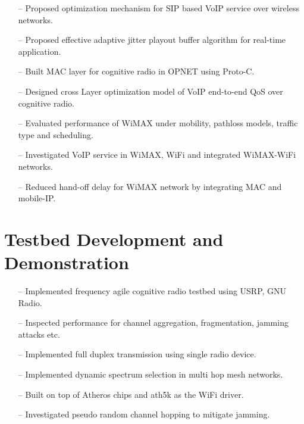 \documentclass[11pt,letterpaper,sans]{moderncv}   %
\begin{document}
  {
  \begin{itemize}
    \item[--] Proposed optimization mechanism for SIP based VoIP service over wireless networks.
    \item[--] Proposed effective adaptive jitter playout buffer algorithm for real-time application.
    \item[--] Built MAC layer for cognitive radio in OPNET using Proto-C.
    \item[--] Designed cross Layer optimization model of VoIP end-to-end QoS over cognitive radio.
  \end{itemize}
  }


  {
  \begin{itemize}
    \item[--] Evaluated performance of WiMAX under mobility, pathloss models, traffic type and scheduling.
    \item[--] Investigated VoIP service in WiMAX, WiFi and integrated WiMAX-WiFi networks.
    \item[--] Reduced hand-off delay for WiMAX network  by integrating  MAC and mobile-IP.
  \end{itemize}
  }


\section{Testbed Development and Demonstration}
  {
  \begin{itemize}
    \item[--] Implemented frequency agile cognitive radio testbed using USRP, GNU Radio.
    \item[--] Inspected performance for channel aggregation, fragmentation, jamming attacks etc.
    \item[--] Implemented full duplex transmission using single radio device.
    \item[--] Implemented dynamic spectrum selection in multi hop mesh networks.
  \end{itemize}
  }

  {
  \begin{itemize}
    \item[--] Built on top of Atheros chips and ath5k as the WiFi driver.
    \item[--] Investigated pseudo random channel hopping to mitigate jamming.
  \end{itemize}
  }
\end{document}
